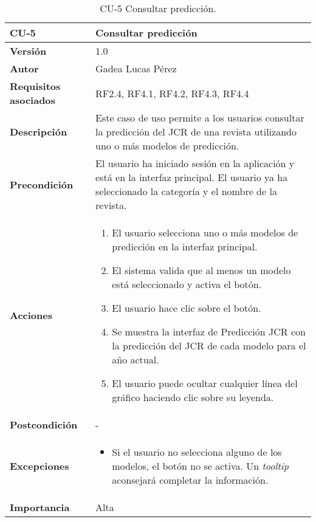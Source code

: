 \begin{itemize}
\begin{table}[p]
\centering
\begin{tabularx}{\linewidth}{ p{} p{} }
\toprule
\textbf{CU-5} & \textbf{Consultar predicción}\\
\toprule
\textbf{Versión} & 1.0 \\
\textbf{Autor} & Gadea Lucas Pérez \\
\textbf{Requisitos asociados} & RF2.4, RF4.1, RF4.2, RF4.3, RF4.4 \\
\textbf{Descripción} & Este caso de uso permite a los usuarios consultar la predicción del JCR de una revista utilizando uno o más modelos de predicción.\\
\textbf{Precondición} & El usuario ha iniciado sesión en la aplicación y está en la interfaz principal. El usuario ya ha seleccionado la categoría y el nombre de la revista.\\
\textbf{Acciones} &
\begin{enumerate}
\def\labelenumi{\arabic{enumi}.}
\tightlist
\item El usuario selecciona uno o más modelos de predicción en la interfaz principal.
\item El sistema valida que al menos un modelo está seleccionado y activa el botón. 
\item El usuario hace clic sobre el botón.
\item Se muestra la interfaz de Predicción JCR con la predicción del JCR de cada modelo para el año actual.
\item El usuario puede ocultar cualquier línea del gráfico haciendo clic sobre su leyenda.
\end{enumerate}\\
\textbf{Postcondición} & - \\
\textbf{Excepciones} &
\begin{itemize}
    \item Si el usuario no selecciona alguno de los modelos, el botón no se activa. Un \textit{tooltip} aconsejará completar la información.
\end{itemize} \\
\textbf{Importancia} & Alta\\
\bottomrule
\end{tabularx}
\caption{CU-5 Consultar predicción.}
\label{tab:cu5}
\end{table}


\end{itemize}
